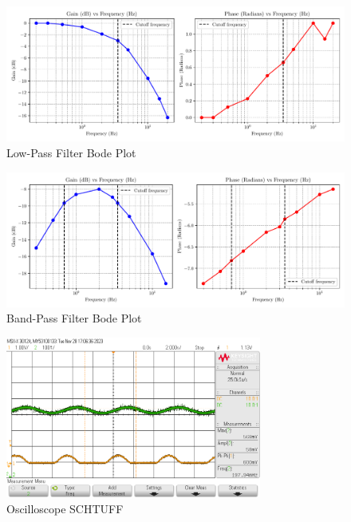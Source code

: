 \documentclass[CMPE]{KGCOEReport}
\begin{document}
\begin{figure}[H]
    \centering
    \includegraphics[width=1\textwidth]{low_pass_plot.pdf}
    \caption{Low-Pass Filter Bode Plot}
    \label{fig:lowPassBode}
\end{figure}

\begin{figure}[H]
    \centering
    \includegraphics[width=1\textwidth]{band_pass_plot.pdf}
    \caption{Band-Pass Filter Bode Plot}
    \label{fig:bandPassBode}
\end{figure}

\begin{figure}[H]
    \centering
    \includegraphics[width=0.75\textwidth]{200mHz.png}
    \caption{Oscilloscope SCHTUFF}
    \label{fig:200mHzCapture}
\end{figure}
\end{document}
